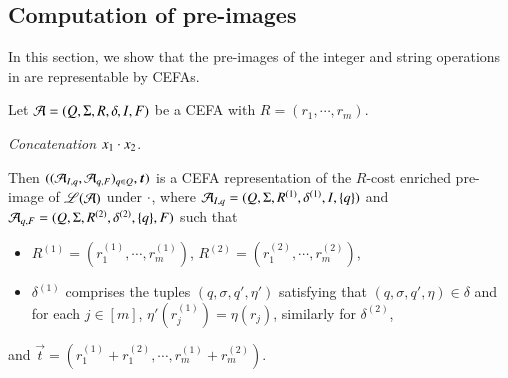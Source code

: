 



\subsection{Computation of pre-images}
In this section, we show that the pre-images of the integer and string operations in {\slint} are representable by CEFAs. %

Let $\mathcal{A}=(Q, \Sigma, R, \delta, I, F)$ be a CEFA with $R= (r_1, \cdots, r_m)$. 

\smallskip
\noindent \emph{Concatenation $x_1 \cdot x_2$}.

\smallskip

Then $((\NFA_{I, q}, \NFA_{q, F})_{q \in Q}, \vec{t})$ is a CEFA representation of the $R$-cost enriched pre-image of $\mathscr{L}(\mathcal{A})$ under $\cdot$, where $\mathcal{A}_{I, q}=(Q, \Sigma, R^{(1)}, \delta^{(1)}, I, \{q\})$ and  $\mathcal{A}_{q, F}=(Q, \Sigma, R^{(2)}, \delta^{(2)}, \{q\}, F)$ such that 
\begin{itemize}
\item $R^{(1)} = (r^{(1)}_1, \cdots, r^{(1)}_m)$, $R^{(2)} = (r^{(2)}_1, \cdots, r^{(2)}_m)$, 
\item $\delta^{(1)}$ comprises the tuples $(q, \sigma, q', \eta')$ satisfying that $(q, \sigma, q', \eta) \in \delta$ and for each $j \in [m]$, $\eta'(r^{(1)}_j)=\eta(r_j)$,  similarly for $\delta^{(2)}$,
\end{itemize}
and $\vec{t} = (r^{(1)}_1 + r^{(2)}_1, \cdots, r^{(1)}_m + r^{(2)}_m)$.



